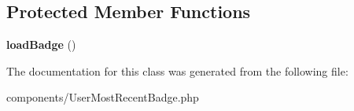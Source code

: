 \subsection*{Protected Member Functions}
\begin{DoxyCompactItemize}
\item 
\hypertarget{classDMA_1_1Friends_1_1Components_1_1UserMostRecentBadge_a179a91722a84fac694d318d67c97f0e0}{{\bfseries load\+Badge} ()}\label{classDMA_1_1Friends_1_1Components_1_1UserMostRecentBadge_a179a91722a84fac694d318d67c97f0e0}

\end{DoxyCompactItemize}


The documentation for this class was generated from the following file\+:\begin{DoxyCompactItemize}
\item 
components/User\+Most\+Recent\+Badge.\+php\end{DoxyCompactItemize}
